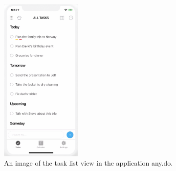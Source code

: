 \begin{figure}[htb]

	\centering
	\includegraphics[width=4cm]{./graphics/anydo.png}
	\caption{An image of the task list view in the application any.do\cite{any.do}.}
	\label{fig:anydo}
	
\end{figure}